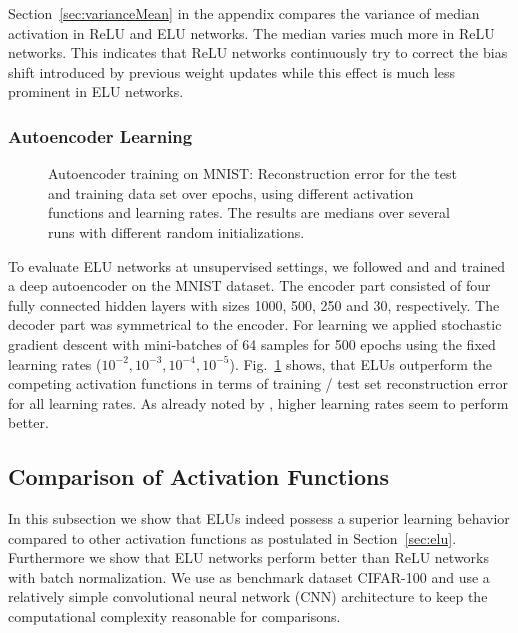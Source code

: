 \documentclass{article}
\begin{document}
Section~\ref{sec:varianceMean} in the appendix compares the variance
of median activation in ReLU and ELU networks.
The median varies much more in ReLU networks.
This indicates that ReLU networks continuously try to correct
the bias shift introduced by previous weight updates
while this effect is much less prominent in ELU networks.

\subsubsection{Autoencoder Learning}

\begin{figure}[!ht]
\begin{center}
\end{center}
\caption{Autoencoder training on MNIST: Reconstruction error for the test and training  data set over
epochs, using different activation functions and learning rates. The results are medians
over several runs with different random initializations.
\label{fig:mnistAuto}}
\end{figure}




To evaluate ELU networks at unsupervised settings, we followed
\citet{Martens:10} and \citet{Desjardins:15} and trained a
deep autoencoder on the MNIST dataset.
The encoder part consisted of four
fully connected hidden layers with sizes 1000, 500, 250 and 30, respectively.
The decoder part was symmetrical to the encoder.
For learning we applied stochastic gradient descent with mini-batches of 64 samples for 500 epochs
using the fixed learning rates ($10^{-2}, 10^{-3}, 10^{-4}, 10^{-5}$).
Fig.~\ref{fig:mnistAuto} shows, that ELUs outperform the competing
activation functions in terms of training / test set reconstruction error for all learning rates.
As already noted by \citet{Desjardins:15}, higher learning rates
seem to perform better.



\subsection{Comparison of Activation Functions}
\label{sec:compFunctions}

In this subsection we show that ELUs indeed possess a superior
learning behavior compared to other activation functions as
postulated in Section~\ref{sec:elu}.
Furthermore we show that ELU networks perform better than ReLU
networks with batch normalization.
We use as benchmark dataset CIFAR-100 and use a relatively
simple convolutional neural network (CNN) architecture to keep the
computational complexity reasonable for comparisons.
\end{document}
